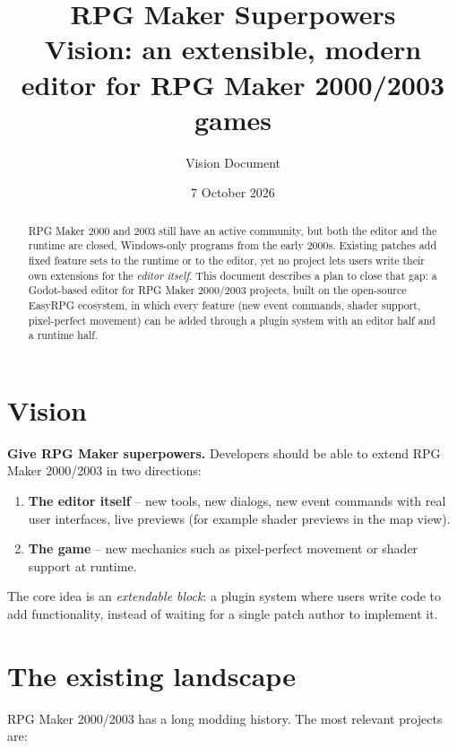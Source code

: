 \documentclass[11pt,a4paper]{article}
\title{\textbf{RPG Maker Superpowers}\\[4pt]
\large Vision: an extensible, modern editor for RPG Maker 2000/2003 games}
\author{Vision Document}
\date{7 October 2026}
\begin{document}
\maketitle

\begin{abstract}
RPG Maker 2000 and 2003 still have an active community, but both the editor and the
runtime are closed, Windows-only programs from the early 2000s. Existing patches add
fixed feature sets to the runtime or to the editor, yet no project lets users write
their own extensions for the \emph{editor itself}. This document describes a plan to
close that gap: a Godot-based editor for RPG Maker 2000/2003 projects, built on the
open-source EasyRPG ecosystem, in which every feature (new event commands, shader
support, pixel-perfect movement) can be added through a plugin system with an editor
half and a runtime half.
\end{abstract}

\tableofcontents

\section{Vision}

\textbf{Give RPG Maker superpowers.} Developers should be able to extend RPG Maker
2000/2003 in two directions:

\begin{enumerate}
  \item \textbf{The editor itself} -- new tools, new dialogs, new event commands with
        real user interfaces, live previews (for example shader previews in the map view).
  \item \textbf{The game} -- new mechanics such as pixel-perfect movement or shader
        support at runtime.
\end{enumerate}

The core idea is an \emph{extendable block}: a plugin system where users write code to
add functionality, instead of waiting for a single patch author to implement it.

\section{The existing landscape}

RPG Maker 2000/2003 has a long modding history. The most relevant projects are:
\end{document}
